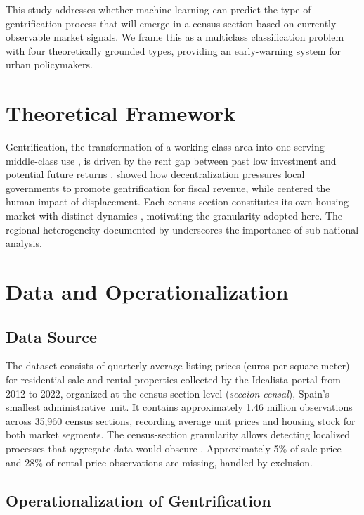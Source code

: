 \documentclass[12pt,a4paper]{article}
\begin{document}
This study addresses whether machine learning can predict the type of gentrification process that will emerge in a census section based on currently observable market signals. We frame this as a multiclass classification problem with four theoretically grounded types, providing an early-warning system for urban policymakers.

\section{Theoretical Framework}

Gentrification, the transformation of a working-class area into one serving middle-class use \citep{sequera2013politicas}, is driven by the rent gap between past low investment and potential future returns \citep{smith2005rent}. \citet{hackworth2001changing} showed how decentralization pressures local governments to promote gentrification for fiscal revenue, while \citet{slater2011gentrification} centered the human impact of displacement. Each census section constitutes its own housing market with distinct dynamics \citep{himmelberg2005assessing}, motivating the granularity adopted here. The regional heterogeneity documented by \citet{larraz2008cointegration} underscores the importance of sub-national analysis.

\section{Data and Operationalization}

\subsection{Data Source}

The dataset consists of quarterly average listing prices (euros per square meter) for residential sale and rental properties collected by the Idealista portal from 2012 to 2022, organized at the census-section level (\textit{seccion censal}), Spain's smallest administrative unit. It contains approximately 1.46 million observations across 35,960 census sections, recording average unit prices and housing stock for both market segments. The census-section granularity allows detecting localized processes that aggregate data would obscure \citep{himmelberg2005assessing, brunocueto2023analisis}. Approximately 5\% of sale-price and 28\% of rental-price observations are missing, handled by exclusion.

\subsection{Operationalization of Gentrification}
\end{document}
